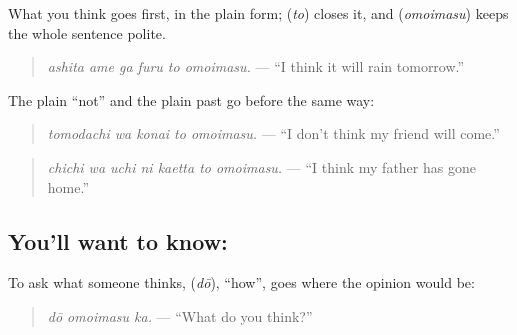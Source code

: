 What you think goes first, in the plain form; \textbf{} (\emph{to}) closes it, and \textbf{} (\emph{omoimasu}) keeps the whole sentence polite.

\begin{quote}
\textbf{   }
\end{quote}

\begin{quote}
\emph{ashita ame ga furu to omoimasu.} — \textquotedblleft{}I think it will rain tomorrow.\textquotedblright{}
\end{quote}

The plain \textquotedblleft{}not\textquotedblright{} and the plain past go before \textbf{} the same way:

\begin{quote}
\textbf{  }
\end{quote}

\begin{quote}
\emph{tomodachi wa konai to omoimasu.} — \textquotedblleft{}I don't think my friend will come.\textquotedblright{}
\end{quote}

\begin{quote}
\textbf{   }
\end{quote}

\begin{quote}
\emph{chichi wa uchi ni kaetta to omoimasu.} — \textquotedblleft{}I think my father has gone home.\textquotedblright{}
\end{quote}

\subsection*{You'll want to know:  }
To ask what someone thinks, \textbf{} (\emph{dō}), \textquotedblleft{}how\textquotedblright{}, goes where the opinion would be:

\begin{quote}
\textbf{ }
\end{quote}

\begin{quote}
\emph{dō omoimasu ka.} — \textquotedblleft{}What do you think?\textquotedblright{}
\end{quote}

\begin{quote}
\textbf{   }
\end{quote}

